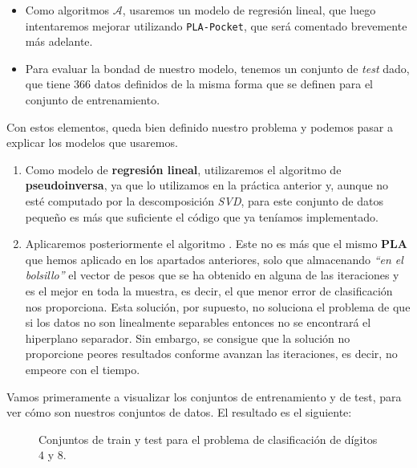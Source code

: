 \documentclass[12pt]{article}
\begin{document}
{\begin{itemize}
\item Como algoritmos $\mathcal A$, usaremos un modelo de regresión lineal, que luego intentaremos mejorar utilizando \lstinline{PLA-Pocket}, que será comentado brevemente más adelante.

\item Para evaluar la bondad de nuestro modelo, tenemos un conjunto de \emph{test} dado, que tiene $366$ datos definidos de la misma forma que se definen para el conjunto de entrenamiento.


\end{itemize}

Con estos elementos, queda bien definido nuestro problema y podemos pasar a explicar los modelos que usaremos. 
\begin{enumerate}
\item Como modelo de \textbf{regresión lineal}, utilizaremos el algoritmo de \textbf{pseudoinversa}, ya que lo utilizamos en la práctica anterior y, aunque no esté computado por la descomposición \emph{SVD}, para este conjunto de datos pequeño es más que suficiente el código que ya teníamos implementado.

\item Aplicaremos posteriormente el algoritmo . Este no es más que el mismo \textbf{PLA} que hemos aplicado en los apartados anteriores, solo que almacenando \emph{``en el bolsillo''} el vector de pesos que se ha obtenido en alguna de las iteraciones y es el mejor en toda la muestra, es decir, el que menor error de clasificación nos proporciona. Esta solución, por supuesto, no soluciona el problema de que si los datos no son linealmente separables entonces no se encontrará el hiperplano separador. Sin embargo, se consigue que la solución no proporcione peores resultados conforme avanzan las iteraciones, es decir, no empeore con el tiempo.

\end{enumerate}


Vamos primeramente a visualizar los conjuntos de entrenamiento y de test, para ver cómo son nuestros conjuntos de datos. El resultado es el siguiente:
\begin{figure}[H]
  \centering
  \qquad
  \caption{Conjuntos de train y test para el problema de clasificación de dígitos $4$ y $8$.}
\label{fig:myfig:4}
\end{figure}

}
\end{document}
